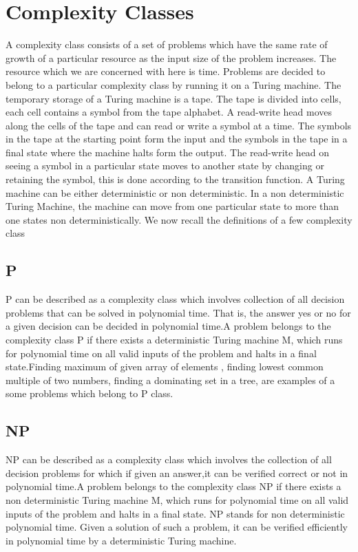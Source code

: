 \chapter{Complexity Classes} 
A complexity class consists of a set of problems which have the same rate of growth of a
particular resource as the input size of the problem increases. The resource which we are
concerned with here is time. Problems are decided to belong to a particular complexity class
by running it on a Turing machine.
The temporary storage of a Turing machine is a tape. The tape is divided into cells,
each cell contains a symbol from the tape alphabet. A read-write head moves along the cells
of the tape and can read or write a symbol at a time. The symbols in the tape at the starting
point form the input and the symbols in the tape in a final state where the machine halts form
the output. The read-write head on seeing a symbol in a particular state moves to another
state by changing or retaining the symbol, this is done according to the transition function.
A Turing machine can be either deterministic or non deterministic. In a non deterministic
Turing Machine, the machine can move from one particular state to more than one states
non deterministically. We now recall the definitions of a few complexity class

\section{P}
\noindent
P can be described as a complexity class which involves collection of all decision problems
that can be solved in polynomial time. That is, the answer yes or no for a given decision can
be decided in polynomial time.A problem belongs to the complexity class P if there exists
a deterministic Turing machine M, which runs for polynomial time on all valid inputs of
the problem and halts in a final state.Finding maximum of given array of elements , finding
lowest common multiple of two numbers, finding a dominating set in a tree, are examples of
a some problems which belong to P class.
\section{NP}
\noindent
NP can be described as a complexity class which involves the collection of all
decision problems for which if given an answer,it can be verified correct or not in
polynomial time.A problem belongs to the complexity class NP if there exists a non
deterministic Turing machine M, which runs for polynomial time on all valid inputs of
the problem and halts in a final state. NP stands for non deterministic polynomial time.
Given a solution of such a problem, it can be verified efficiently in polynomial time by a
deterministic Turing machine.
